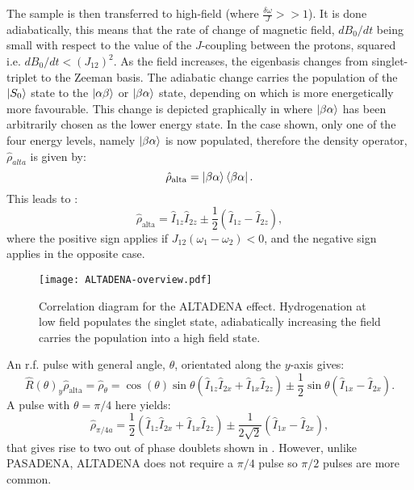  The sample is then transferred to high-field (where $\frac{\delta{\omega}}{J}>>1$). It is done adiabatically, this means that the rate
 of change of magnetic field, $dB_0/dt$ being small with respect to the value of the $J$-coupling between the protons, squared i.e. $dB_0/dt < (J_{12})^2$. As
 the field increases, the eigenbasis changes from singlet-triplet to the Zeeman basis. The adiabatic change carries the population of the
 $\ket{S_0}$ state to the $\ket{\alpha\beta}$ or $\ket{\beta\alpha}$ state, depending on which is more energetically more favourable.
 This change is depicted graphically in  where $\ket{\beta\alpha}$ has been arbitrarily chosen as the lower energy state.
 In the case shown, only one of the four energy levels, namely $\ket{\beta\alpha}$ is now populated, therefore the density operator, $\hat{\rho}_{alta}$ is given by:
 \begin{equation}
   \hat{\rho}_{\text{alta}} = \ket{\beta\alpha}\bra{\beta\alpha}.
 \end{equation}
  This leads to \citep{RN128}:
 \begin{equation}
   \hat{\rho}_{\text{alta}} = \hat{I}_{1z}\hat{I}_{2z}±\frac{1}{2}(\hat{I}_{1z}-\hat{I}_{2z}),
 \end{equation}
 where the positive sign applies if $J_{12}(\omega_1 - \omega_2)<0$, and the negative
 sign applies in the opposite case.

 \begin{figure}
   \begin{center}
   \texttt{[image: ALTADENA-overview.pdf]}
   \end{center}
   \caption{Correlation diagram for the ALTADENA effect. Hydrogenation at low field populates the singlet state, adiabatically increasing
   the field carries the population into a high field state.}
   \label{fig:SingletTriplet}
 \end{figure}

 An r.f. pulse with general angle, $\theta$, orientated along the $y$-axis gives:
 \begin{equation}
   \hat{R}(\theta)_y\hat{\rho}_{\text{alta}} = \hat{\rho}_\theta = \cos(\theta)\sin{\theta}(\hat{I}_{1z}\hat{I}_{2x} + \hat{I}_{1x}\hat{I}_{2z})
   ± \frac{1}{2}\sin\theta(\hat{I}_{1x} - \hat{I}_{2x}).
 \end{equation}
 A pulse with $\theta = \pi/4$ here yields:
 \begin{equation}
   \hat{\rho}_{\pi/4a} = \frac{1}{2}(\hat{I}_{1z}\hat{I}_{2x} + \hat{I}_{1x}\hat{I}_{2z}) ± \frac{1}{2\sqrt{2}}(\hat{I}_{1x} - \hat{I}_{2x}),
 \end{equation}
 that gives rise to two out of phase doublets shown in . However, unlike PASADENA, ALTADENA does not require
 a $\pi/4$ pulse so $\pi/2$ pulses are more common.

